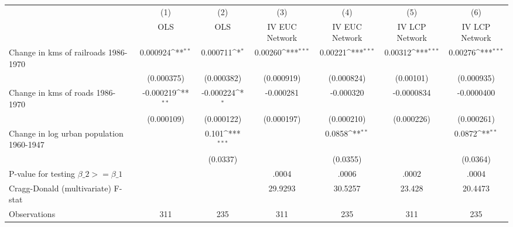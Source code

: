 {
\def\sym#1{\ifmmode^{#1}\else\(^{#1}\)\fi}
\begin{tabular}{l*{6}{c}}
\hline\hline
                &\multicolumn{1}{c}{(1)}&\multicolumn{1}{c}{(2)}&\multicolumn{1}{c}{(3)}&\multicolumn{1}{c}{(4)}&\multicolumn{1}{c}{(5)}&\multicolumn{1}{c}{(6)}\\
                &\multicolumn{1}{c}{OLS}&\multicolumn{1}{c}{OLS}&\multicolumn{1}{c}{IV EUC Network}&\multicolumn{1}{c}{IV EUC Network}&\multicolumn{1}{c}{IV LCP Network}&\multicolumn{1}{c}{IV LCP Network}\\
\hline
Change in kms of railroads 1986-1970& 0.000924\sym{**} & 0.000711\sym{*}  &  0.00260\sym{***}&  0.00221\sym{***}&  0.00312\sym{***}&  0.00276\sym{***}\\
                &(0.000375)         &(0.000382)         &(0.000919)         &(0.000824)         &(0.00101)         &(0.000935)         \\
[1em]
Change in kms of roads 1986-1970&-0.000219\sym{**} &-0.000224\sym{*}  &-0.000281         &-0.000320         &-0.0000834         &-0.0000400         \\
                &(0.000109)         &(0.000122)         &(0.000197)         &(0.000210)         &(0.000226)         &(0.000261)         \\
[1em]
Change in log urban population 1960-1947&                  &    0.101\sym{***}&                  &   0.0858\sym{**} &                  &   0.0872\sym{**} \\
                &                  & (0.0337)         &                  & (0.0355)         &                  & (0.0364)         \\
\hline
P-value for testing $\beta\_{2} >= \beta\_{1}$&                  &                  &    .0004         &    .0006         &    .0002         &    .0004         \\
Cragg-Donald (multivariate) F-stat&                  &                  &  29.9293         &  30.5257         &   23.428         &  20.4473         \\
Observations    &      311         &      235         &      311         &      235         &      311         &      235         \\
\hline\hline
\end{tabular}
}
